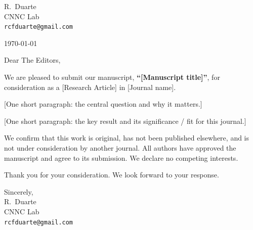 \documentclass[11pt,a4paper]{article}
\makeatletter
\newcommand{\sender}{R.\ Duarte \\ CNNC Lab \\ \texttt{rcfduarte@gmail.com}}
\newcommand{\letterdate}{\today}
\newcommand{\editor}{The Editors}
\newcommand{\journalname}{[Journal name]}
\makeatother
\begin{document}
{\raggedleft \sender \par}
\vspace{2ex}
\letterdate

\vspace{2ex}
Dear \editor,

\vspace{1ex}
We are pleased to submit our manuscript, \textbf{``[Manuscript title]''}, for consideration
as a [Research Article] in \journalname.

[One short paragraph: the central question and why it matters.]

[One short paragraph: the key result and its significance / fit for this journal.]

We confirm that this work is original, has not been published elsewhere, and is not under
consideration by another journal. All authors have approved the manuscript and agree to its
submission. We declare no competing interests.

Thank you for your consideration. We look forward to your response.

\vspace{2ex}
Sincerely, \\
\sender
\end{document}
